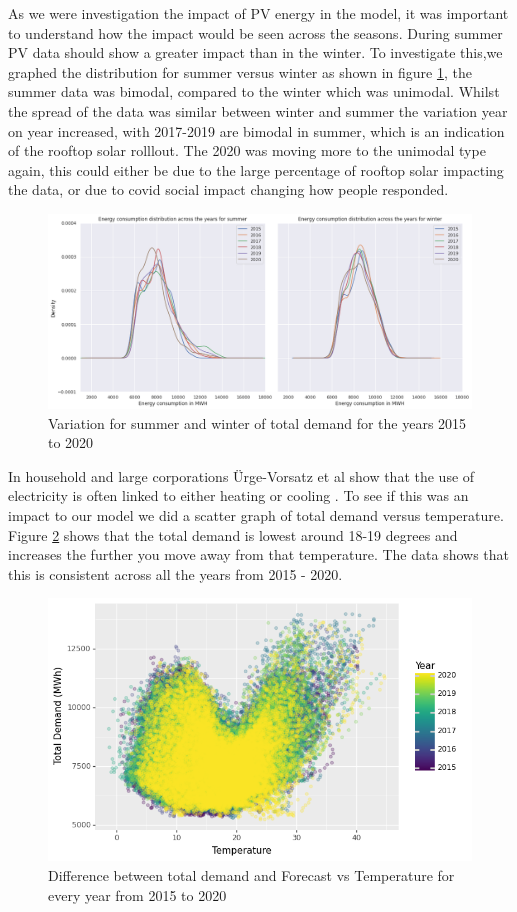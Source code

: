 \documentclass[mstat,12pt]{unswthesis}
\begin{document}
As we were investigation the impact of PV energy in the model, it was
important to understand how the impact would be seen across the seasons.
During summer PV data should show a greater impact than in the winter.
To investigate this,we graphed the distribution for summer versus winter
as shown in figure \ref{image9}, the summer data was bimodal, compared
to the winter which was unimodal. Whilst the spread of the data was
similar between winter and summer the variation year on year increased,
with 2017-2019 are bimodal in summer, which is an indication of the
rooftop solar rolllout. The 2020 was moving more to the unimodal type
again, this could either be due to the large percentage of rooftop solar
impacting the data, or due to covid social impact changing how people
responded.

\begin{figure}[H]
\includegraphics[width=140mm]{image9.png}
\caption{ Variation for summer and winter of total demand for the years 2015 to 2020}
\label{image9}
\end{figure}

In household and large corporations Ürge-Vorsatz et al show that the use
of electricity is often linked to either heating or cooling
\cite{rgevorsatz_2015_heating}. To see if this was an impact to our
model we did a scatter graph of total demand versus temperature. Figure
\ref{image25} shows that the total demand is lowest around 18-19 degrees
and increases the further you move away from that temperature. The data
shows that this is consistent across all the years from 2015 - 2020.

\begin{figure}[H]
\includegraphics[width=140mm]{image25.png}
\caption{Difference between total demand and Forecast vs Temperature for every year from 2015 to 2020}
\label{image25}
\end{figure}
\end{document}

